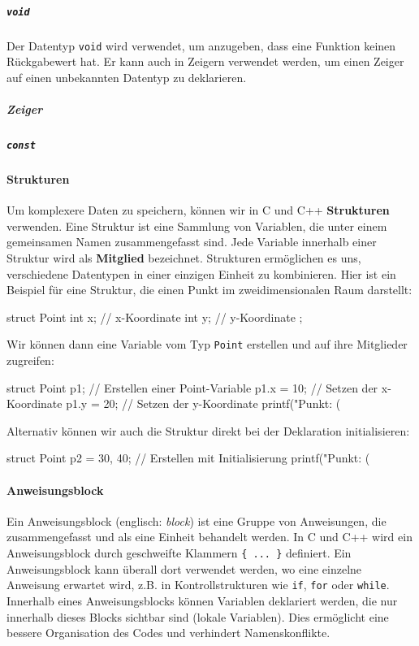 \subparagraph{\texttt{void}}
Der Datentyp \texttt{void} wird verwendet, um anzugeben, dass eine Funktion keinen Rückgabewert hat. Er kann auch in Zeigern verwendet werden, um einen Zeiger auf einen unbekannten Datentyp zu deklarieren.

\subparagraph{Zeiger}

\subparagraph{\texttt{const}}

\paragraph{Strukturen}
\label{sec:referenz:c:struct}

Um komplexere Daten zu speichern, können wir in C und C++ \textbf{Strukturen} verwenden. Eine Struktur ist eine Sammlung von Variablen, die unter einem gemeinsamen Namen zusammengefasst sind. Jede Variable innerhalb einer Struktur wird als \textbf{Mitglied} bezeichnet. Strukturen ermöglichen es uns, verschiedene Datentypen in einer einzigen Einheit zu kombinieren.
Hier ist ein Beispiel für eine Struktur, die einen Punkt im zweidimensionalen Raum darstellt:
\begin{code}
struct Point {
    int x; // x-Koordinate
    int y; // y-Koordinate
};
\end{code}
Wir können dann eine Variable vom Typ \texttt{Point} erstellen und auf ihre Mitglieder zugreifen:
\begin{code}
struct Point p1; // Erstellen einer Point-Variable
p1.x = 10; // Setzen der x-Koordinate
p1.y = 20; // Setzen der y-Koordinate
printf("Punkt: (%
\end{code}
Alternativ können wir auch die Struktur direkt bei der Deklaration initialisieren:
\begin{code}
struct Point p2 = {30, 40}; // Erstellen mit Initialisierung
printf("Punkt: (%
\end{code}

\paragraph{Anweisungsblock}
\label{sec:referenz:c:block}

Ein Anweisungsblock (englisch: \textit{block}) ist eine Gruppe von Anweisungen, die zusammengefasst und als eine Einheit behandelt werden. In C und C++ wird ein Anweisungsblock durch geschweifte Klammern \texttt{\{ ... \}} definiert. Ein Anweisungsblock kann überall dort verwendet werden, wo eine einzelne Anweisung erwartet wird, z.B. in Kontrollstrukturen wie \texttt{if}, \texttt{for} oder \texttt{while}. Innerhalb eines Anweisungsblocks können Variablen deklariert werden, die nur innerhalb dieses Blocks sichtbar sind (lokale Variablen). Dies ermöglicht eine bessere Organisation des Codes und verhindert Namenskonflikte.

